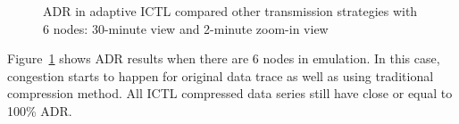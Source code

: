 \documentclass[12pt]{report}
\begin{document}
\begin{figure}[H]
  \caption{\label{fig:adaptive_adr_6}ADR in adaptive ICTL compared other transmission strategies with 6 nodes: 30-minute view and 2-minute zoom-in view}
\end{figure}

Figure~\ref{fig:adaptive_adr_6} shows ADR results when there are 6 nodes in emulation. In this case, congestion starts to happen for original data trace as well as using traditional compression method. All ICTL compressed data series still have close or equal to 100\% ADR.
\end{document}
